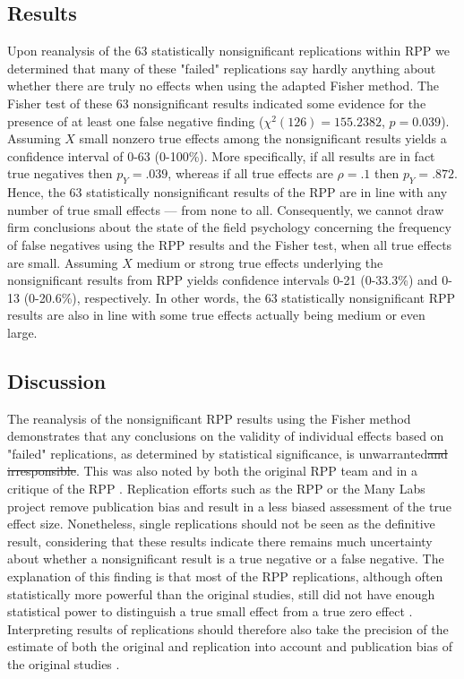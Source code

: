 \documentclass{article}
\providecommand{\DIFdeltex}[1]{{\protect\color{red}\sout{#1}}}                      %
\providecommand{\DIFdelbegin}{} %
\providecommand{\DIFdelend}{} %
\providecommand{\DIFdel}[1]{\texorpdfstring{\DIFdeltex{#1}}{}} %
\begin{document}
\subsection*{Results}



Upon reanalysis of the 63 statistically nonsignificant replications within RPP we determined that many of these "failed" replications say hardly anything about whether there are truly no effects when using the adapted Fisher method. The Fisher test of these 63 nonsignificant results indicated some evidence for the presence of at least one false negative finding ($\chi^2(126)=155.2382$, $p=0.039$). Assuming $X$ small nonzero true effects among the nonsignificant results yields a confidence interval of 0-63 (0-100\%). More specifically, if all results are in fact true negatives then $p_Y=.039$, whereas if all true effects are $\rho=.1$ then $p_Y=.872$. Hence, the 63 statistically nonsignificant results of the RPP are in line with any number of true small effects --- from none to all. Consequently, we cannot draw firm conclusions about the state of the field psychology concerning the frequency of false negatives using the RPP results and the Fisher test, when all true effects are small. Assuming $X$ medium or strong true effects underlying the nonsignificant results from RPP yields confidence intervals 0-21 (0-33.3\%) and 0-13 (0-20.6\%), respectively. In other words, the 63 statistically nonsignificant RPP results are also in line with some true effects actually being medium or even large.

\subsection*{Discussion}

The reanalysis of the nonsignificant RPP results using the Fisher method demonstrates that any conclusions on the validity of individual effects based on "failed" replications, as determined by statistical significance, is unwarranted\DIFdelbegin \DIFdel{and irresponsible}\DIFdelend . This was also noted by both the original RPP team \cite{Open_Science_Collaboration2015-zs,Anderson2016-bv} and in a critique of the RPP \cite{Gilbert2016-mi}. Replication efforts such as the RPP or the Many Labs project remove publication bias and result in a less biased assessment of the true effect size. Nonetheless, single replications should not be seen as the definitive result, considering that these results indicate there remains much uncertainty about whether a nonsignificant result is a true negative or a false negative. The explanation of this finding is that most of the RPP replications, although often statistically more powerful than the original studies, still did not have enough statistical power to distinguish a true small effect from a true zero effect \cite{Maxwell2015-yb}. Interpreting results of replications should therefore also take the precision of the estimate of both the original and replication into account \cite{Cumming2014-fi} and publication bias of the original studies \cite{10.1371/journal.pone.0149794}.
\end{document}
